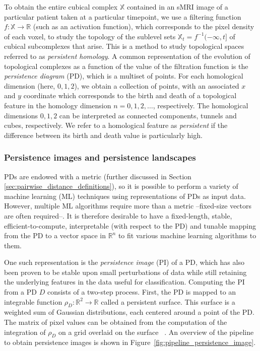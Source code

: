 \documentclass{article}
\begin{document}
To obtain the entire cubical complex $\mathbb{X}$ contained in an sMRI image of a particular patient
taken at a particular timepoint, we use a filtering function $f:\mathbb{X}\to\mathbb{R}$ (such as an
activation function), which corresponds to the pixel density of each voxel, to study the topology of
the sublevel sets $\mathbb{X}_t=f^{-1}(-\infty, t]$ of cubical subcomplexes that arise. This is a
method to study topological spaces referred to as \emph{persistent homology}. A common
representation of the evolution of topological complexes as a function of the value of the
filtration function is the \emph{persistence diagram} (PD), which is a multiset of points. For each
homological dimension (here, $0,1,2$), we obtain a collection of points, with an associated $x$ and
$y$ coordinate which corresponds to the birth and death of a topological feature in the homology
dimension $n=0,1,2,\ldots$, respectively. The homological dimensions $0,1,2$ can be interpreted as
connected components, tunnels and cubes, respectively. We refer to a homological feature as
\emph{persistent} if the difference between its birth and death value is particularly high.


\subsubsection{Persistence images and persistence
  landscapes}\label{sec:theory_persistence_landscape_persistence_image}

PDs are endowed with a metric (further discussed in Section
\ref{sec:pairwise_distance_definitions}), so it is possible to perform a variety of machine learning
(ML) techniques using representations of PDs as input data. However, multiple ML algorithms
require more than a metric --fixed-size vectors are often required--. It is therefore
desirable to have a fixed-length, stable, efficient-to-compute, interpretable (with respect to the
PD) and tunable mapping from the PD to a vector space in $\mathbb{R}^n$ to fit various machine
learning algorithms to them.

One such representation is the \emph{persistence image} (PI) of a PD, which has also been proven to
be stable upon small perturbations of data while still retaining the underlying features in the data
useful for classification. Computing the PI from a PD $D$ consists of a two-step process. First, the
PD is mapped to an integrable function $\rho_D : \mathbb{R}^2\to \mathbb{R}$ called a persistent
surface. This surface is a weighted sum of Gaussian distributions, each centered around a point of
the PD. The matrix of pixel values can be obtained from the computation of the integration of
$\rho_D$ on a grid overlaid on the surface ~\citet{adams2017persistence}. An overview of the
pipeline to obtain persistence images is shown in Figure~\ref{fig:pipeline_persistence_image}.
\end{document}
